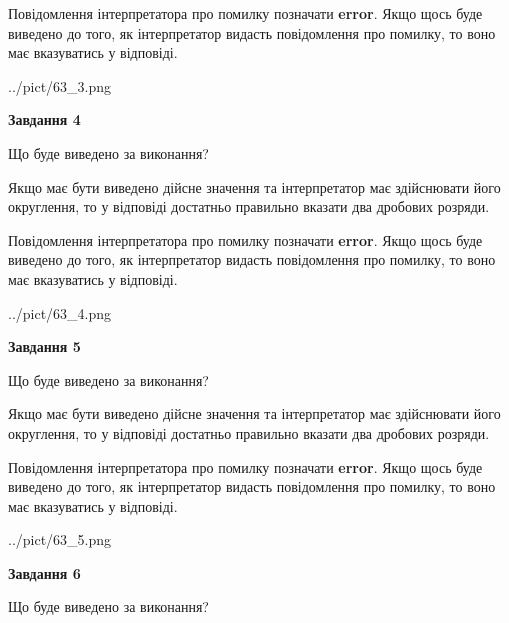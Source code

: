 \documentclass[12pt, ukrainian]{article}
\begin{document}
{\begin {Large}
Повідомлення інтерпретатора про помилку позначати \textbf{error}.
Якщо щось буде виведено до того, як інтерпретатор видасть повідомлення про помилку, 
то воно має вказуватись у відповіді. \par

\begin{center}
	{../pict/63_3.png}
\end{center}
\newpage

{\begin {center}\textbf{Завдання 4}\end {center}}\par
Що буде виведено за виконання? \par

Якщо має бути виведено дійсне значення та інтерпретатор має здійснювати його округлення, 
то у відповіді достатньо правильно вказати два дробових розряди.

Повідомлення інтерпретатора про помилку позначати \textbf{error}.
Якщо щось буде виведено до того, як інтерпретатор видасть повідомлення про помилку, 
то воно має вказуватись у відповіді. \par

\begin{center}
	{../pict/63_4.png}
\end{center}
\newpage

{\begin {center}\textbf{Завдання 5}\end {center}}\par
Що буде виведено за виконання? \par

Якщо має бути виведено дійсне значення та інтерпретатор має здійснювати його округлення, 
то у відповіді достатньо правильно вказати два дробових розряди.

Повідомлення інтерпретатора про помилку позначати \textbf{error}.
Якщо щось буде виведено до того, як інтерпретатор видасть повідомлення про помилку, 
то воно має вказуватись у відповіді. \par

\begin{center}
	{../pict/63_5.png}
\end{center}
\newpage

{\begin {center}\textbf{Завдання 6}\end {center}}\par
Що буде виведено за виконання? \par


\end{Large}}
\end{document}
